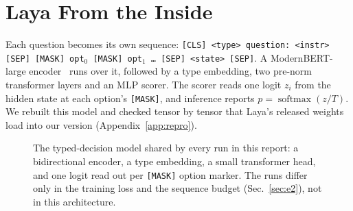 \documentclass[conference]{IEEEtran}
\DeclareMathOperator{\softmax}{softmax}
\begin{document}
\section{Laya From the Inside}
\label{sec:laya}

Each question becomes its own sequence:
\texttt{[CLS] <type> question: <instr> [SEP] [MASK] opt$_0$ [MASK] opt$_1$ \dots\ [SEP] <state> [SEP]}.
A ModernBERT-large encoder~\cite{warner2024modernbert} runs over it, followed
by a type embedding, two pre-norm transformer layers and an MLP scorer. The
scorer reads one logit $z_i$ from the hidden state at each option's
\texttt{[MASK]}, and inference reports $p=\softmax(z/T)$. We rebuilt this
model and checked tensor by tensor that Laya's released weights load into our
version (Appendix~\ref{app:repro}).

\begin{figure}[t]
\centering
{}
\caption{The typed-decision model shared by every run in this report: a
bidirectional encoder, a type embedding, a small transformer head, and one
logit read out per \texttt{[MASK]} option marker. The runs differ only in the
training loss and the sequence budget (Sec.~\ref{sec:e2}), not in this
architecture.}
\label{fig:model}
\end{figure}
\end{document}

